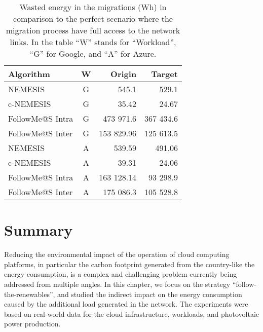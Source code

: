 \begin{table}[!ht]

\caption{Wasted energy in the migrations (Wh) in comparison to the perfect scenario where the migration process have full access to the network links. In the table ``W'' stands for ``Workload'', ``G'' for Google, and ``A'' for Azure.}\label{tab:wasted_mig} \centering
\begin{tabular}{|l|c|r|r|}
  \hline
  \textbf{Algorithm} & \textbf{W}  & \textbf{Origin} & \textbf{Target}   \\
  \hline
  NEMESIS  & G & 545.1  & 529.1 \\
  \hline
  c-NEMESIS & G & 35.42  & 24.67 \\
  \hline
  FollowMe@S Intra & G & 473 971.6 & 367 434.6 \\
  \hline
  FollowMe@S Inter & G & 153 829.96  & 125 613.5  \\
  \hline
  NEMESIS  & A & 539.59  & 491.06 \\
  \hline
  c-NEMESIS & A &  39.31 & 24.06   \\
  \hline
  FollowMe@S Intra & A & 163 128.14  & 93 298.9  \\
  \hline
  FollowMe@S Inter & A & 175 086.3  & 105 528.8 \\
  \hline

\end{tabular}
\end{table}


\section{Summary} \label{sec:conclusion_smargreens}


Reducing the environmental impact of the operation of cloud computing platforms, in particular the carbon footprint generated from the country-like the energy consumption, is a complex and challenging problem currently being addressed from multiple angles. In this chapter, we focus on the strategy ``follow-the-renewables'', and studied the indirect impact on the energy consumption caused by the additional load generated in the network. The experiments were based on real-world data for the cloud infrastructure, workloads, and photovoltaic power production.

